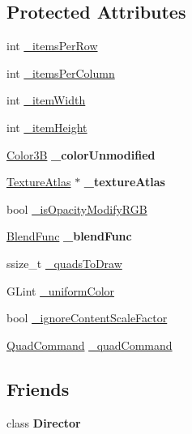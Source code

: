 \subsection*{Protected Attributes}
\begin{DoxyCompactItemize}
\item 
int \hyperlink{classAtlasNode_ac224313faf20d019a9146a2a53c93ea9}{\+\_\+items\+Per\+Row}
\item 
int \hyperlink{classAtlasNode_a195c14ac62fba82ecccc211fa0aefb32}{\+\_\+items\+Per\+Column}
\item 
int \hyperlink{classAtlasNode_a396ab3fb2a06811dee6de4221969827e}{\+\_\+item\+Width}
\item 
int \hyperlink{classAtlasNode_a95aae51f9baec3ddb372ed1e8ee16cd1}{\+\_\+item\+Height}
\item 
\mbox{\label{classAtlasNode_a7cc7570fb9dc70b8dac7f17f9b9fa0d3}} 
\hyperlink{structColor3B}{Color3B} {\bfseries \+\_\+color\+Unmodified}
\item 
\mbox{\label{classAtlasNode_ab58ec4d5f6dda4c30dea17f58351f43d}} 
\hyperlink{classTextureAtlas}{Texture\+Atlas} $\ast$ {\bfseries \+\_\+texture\+Atlas}
\item 
bool \hyperlink{classAtlasNode_ac983ebe69b7021fa28bb0726ebcf3e00}{\+\_\+is\+Opacity\+Modify\+R\+GB}
\item 
\mbox{\label{classAtlasNode_a5a3bbf625792d8685c353723c9ccd9fd}} 
\hyperlink{structBlendFunc}{Blend\+Func} {\bfseries \+\_\+blend\+Func}
\item 
ssize\+\_\+t \hyperlink{classAtlasNode_a64721363834e101ffadd9904b1b1a34f}{\+\_\+quads\+To\+Draw}
\item 
G\+Lint \hyperlink{classAtlasNode_a33ef4d56cc8f62b17fa25d5385173e09}{\+\_\+uniform\+Color}
\item 
bool \hyperlink{classAtlasNode_adae4072d6a5781ce11712b376679ea2b}{\+\_\+ignore\+Content\+Scale\+Factor}
\item 
\hyperlink{classQuadCommand}{Quad\+Command} \hyperlink{classAtlasNode_a88646311a87e439f7fe4ac808eb2282a}{\+\_\+quad\+Command}
\end{DoxyCompactItemize}
\subsection*{Friends}
\begin{DoxyCompactItemize}
\item 
\mbox{\label{classAtlasNode_a96e0e845c153610f2a2f0ad3238a2511}} 
class {\bfseries Director}
\end{DoxyCompactItemize}
